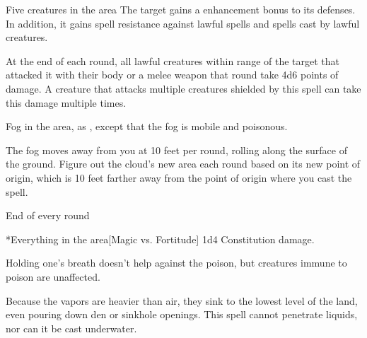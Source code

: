 \spelldur{\durshort \dismissable}
\begin{spelltarget}{Five creatures in the area}
    The target gains a  enhancement bonus to its defenses. In addition, it gains spell resistance against lawful spells and spells cast by lawful creatures.
    \par At the end of each round, all lawful creatures within \rngclose range of the target that attacked it with their body or a melee weapon that round take 4d6 points of damage. A creature that attacks multiple creatures shielded by this spell can take this damage multiple times.
\end{spelltarget}
\spellline
{}

\spelldur{\durshort}
\spellline
\spelleffect Fog in the area, as , except that the fog is mobile and poisonous.

\par The fog moves away from you at 10 feet per round, rolling along the surface of the ground. Figure out the cloud's new area each round based on its new point of origin, which is 10 feet farther away from the point of origin where you cast the spell.
\begin{spelltrigger}{End of every round}
    \begin{spelltargets}*{Everything in the area}[Magic vs. Fortitude]
        \spellsuccess 1d4 Constitution damage.
    \end{spelltargets}
\end{spelltrigger}
\spellnotes Holding one's breath doesn't help against the poison, but creatures immune to poison are unaffected. \fogspellnotes
\par Because the vapors are heavier than air, they sink to the lowest level of the land, even pouring down den or sinkhole openings. This spell cannot penetrate liquids, nor can it be cast underwater.

